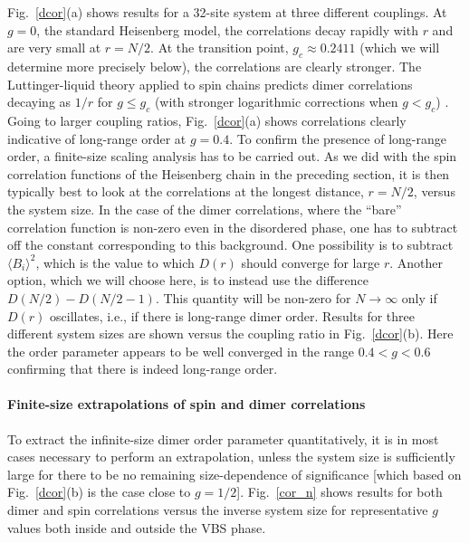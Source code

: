 \documentclass[draft,numberedheadings]{aipproc}
\begin{document}
Fig.~\ref{dcor}(a) shows results for a 32-site system at three different couplings. At $g=0$, the standard Heisenberg model, the correlations decay rapidly
with $r$ and are very small at $r=N/2$. At the transition point, $g_c \approx 0.2411$ (which we will determine more precisely below), the correlations are 
clearly stronger. The Luttinger-liquid theory applied to spin chains predicts dimer correlations decaying as $1/r$ for $g \le g_c$ (with stronger logarithmic 
corrections when $g < g_c$) \cite{voit}. Going to larger coupling ratios, Fig.~\ref{dcor}(a) shows correlations clearly indicative of long-range order at 
$g=0.4$. To confirm the presence of long-range order, a finite-size scaling analysis has to be carried out. As we did with the spin correlation functions of 
the Heisenberg chain in the preceding section, it is then typically best to look at the correlations at the longest distance, $r=N/2$, versus the system size. 
In the case of the dimer correlations, where the ``bare'' correlation function is non-zero even in the disordered phase, one has to subtract off the constant 
corresponding to this background. One possibility is to subtract $\langle B_i\rangle^2$, which is the value to which $D(r)$ should converge for large $r$. 
Another option, which we will choose here, is to instead use the difference $D(N/2)-D(N/2-1)$. This quantity will be non-zero for $N\to \infty$ only if $D(r)$ 
oscillates, i.e., if there is long-range dimer order. Results for three different system sizes are shown versus the coupling ratio in Fig.~\ref{dcor}(b). 
Here the order parameter appears to be well converged in the range $0.4 < g < 0.6$ confirming that there is indeed long-range order. 

\paragraph{Finite-size extrapolations of spin and dimer correlations}

To extract the infinite-size dimer order parameter quantitatively, it is in most cases necessary to perform an extrapolation, unless the system size is sufficiently 
large for there to be no remaining size-dependence of significance [which based on Fig.~\ref{dcor}(b) is the case close to $g=1/2$]. Fig.~\ref{cor_n} shows 
results for both dimer and spin correlations versus the inverse system size for representative $g$ values both inside and outside the VBS phase. 
\end{document}
